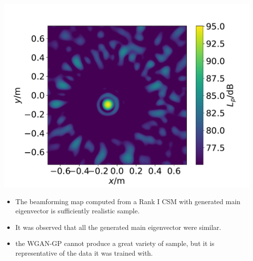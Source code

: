 \documentclass[12pt,pdftex,16x10]{elpres} %
\begin{document}
\begin{psli}
  
    \begin{minipage}[t][0.3\textheight][t]{0.4\textwidth}
      \centering
      \includegraphics[width=1.2\textwidth]{figs/beamforming_map_main_evec_wgangp_generated.pdf}
    \end{minipage}
    \begin{minipage}[b][0.7\textheight][t]{0.5\textwidth}
      \begin{itemize}
          \item The beamforming map computed from a Rank I CSM with generated main eigenvector is sufficiently realistic sample.
          \item It was observed that all the generated main eigenvector were similar.
          \item the WGAN-GP cannot produce a great variety of sample, but it is representative of the data it was trained with.  
      \end{itemize}
    \end{minipage}
  \end{psli}
\end{document}
